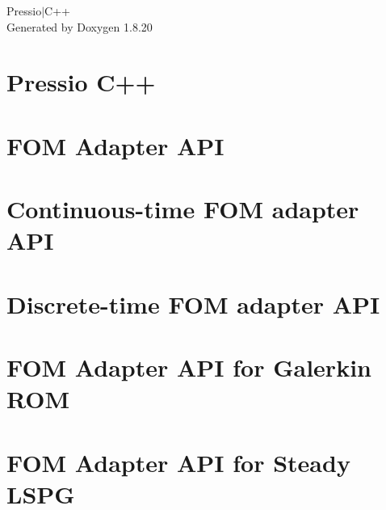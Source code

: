 \let\mypdfximage\pdfximage\def\pdfximage{\immediate\mypdfximage}\documentclass[twoside]{book}
\newcommand{\+}{\discretionary{\mbox{\scriptsize$\hookleftarrow$}}{}{}}
\newcommand{\clearemptydoublepage}{%
  \newpage{\pagestyle{empty}\cleardoublepage}%
}
\begin{document}
\hypersetup{pageanchor=false,
             bookmarksnumbered=true,
             pdfencoding=unicode
            }
\begin{titlepage}
\vspace*{7cm}
\begin{center}%
{\Large Pressio$\vert$\+C++ }\\
\vspace*{1cm}
{\large Generated by Doxygen 1.8.20}\\
\end{center}
\end{titlepage}
\clearemptydoublepage
{}
\tableofcontents
\clearemptydoublepage
{}
\hypersetup{pageanchor=true}

\chapter{Pressio C++}
\label{index}\hypertarget{index}{}
\chapter{F\+OM Adapter A\+PI}
\label{md_pages_adapter_api}

\chapter{Continuous-\/time F\+OM adapter A\+PI}
\label{md_pages_adapter_apis_adapter_continuous_time_api}

\chapter{Discrete-\/time F\+OM adapter A\+PI}
\label{md_pages_adapter_apis_adapter_discrete_time_api}

\chapter{F\+OM Adapter A\+PI for Galerkin R\+OM}
\label{md_pages_adapter_apis_adapter_galerkin_api}

\chapter{F\+OM Adapter A\+PI for Steady L\+S\+PG}
\label{md_pages_adapter_apis_adapter_steady_lspg_api}

\end{document}
